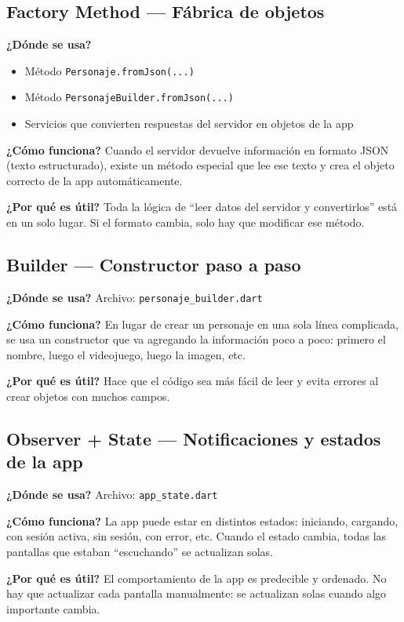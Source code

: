 \documentclass[12pt,a4paper]{article}
\begin{document}
\subsection{Factory Method — Fábrica de objetos}
\textbf{¿Dónde se usa?}
\begin{itemize}[leftmargin=1.2cm]
  \item Método \texttt{Personaje.fromJson(...)}
  \item Método \texttt{PersonajeBuilder.fromJson(...)}
  \item Servicios que convierten respuestas del servidor en objetos de la app
\end{itemize}

\textbf{¿Cómo funciona?} Cuando el servidor devuelve información en formato JSON (texto estructurado), existe un método especial que lee ese texto y crea el objeto correcto de la app automáticamente.

\textbf{¿Por qué es útil?} Toda la lógica de ``leer datos del servidor y convertirlos'' está en un solo lugar. Si el formato cambia, solo hay que modificar ese método.

\subsection{Builder — Constructor paso a paso}
\textbf{¿Dónde se usa?} Archivo: \texttt{personaje\_builder.dart}

\textbf{¿Cómo funciona?} En lugar de crear un personaje en una sola línea complicada, se usa un constructor que va agregando la información poco a poco: primero el nombre, luego el videojuego, luego la imagen, etc.

\textbf{¿Por qué es útil?} Hace que el código sea más fácil de leer y evita errores al crear objetos con muchos campos.

\subsection{Observer + State — Notificaciones y estados de la app}
\textbf{¿Dónde se usa?} Archivo: \texttt{app\_state.dart}

\textbf{¿Cómo funciona?} La app puede estar en distintos estados: iniciando, cargando, con sesión activa, sin sesión, con error, etc. Cuando el estado cambia, todas las pantallas que estaban ``escuchando'' se actualizan solas.

\textbf{¿Por qué es útil?} El comportamiento de la app es predecible y ordenado. No hay que actualizar cada pantalla manualmente: se actualizan solas cuando algo importante cambia.
\end{document}
